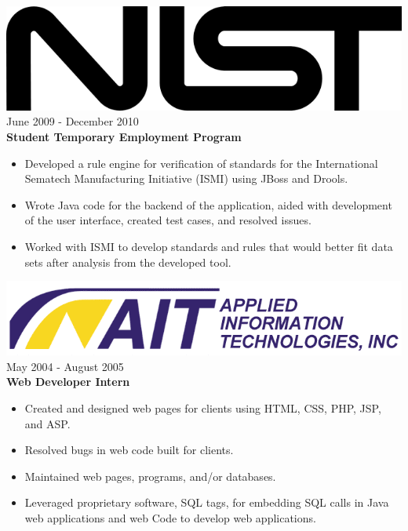 \documentclass[12pt, line, margin]{res}
\begin{document}
\begin{resume}
\pagebreak

	     {\sl \includegraphics[scale=0.07]{resume_images/645px-NIST_logo.png}} \hfill            June 2009 - December 2010 \\
                \textbf{Student Temporary Employment Program}
                \begin{itemize}  \itemsep -2pt %
                 \item Developed a rule engine for verification of standards for the \newline
                               International Sematech Manufacturing Initiative (ISMI) using JBoss
                               and Drools.
                 \item Wrote Java code for the backend of the application, aided
                               with development of the user interface,
                               created test cases, and resolved issues.
                 \item Worked with ISMI to develop standards and rules that would
                               better fit data sets after analysis from the developed tool.
                 \end{itemize} 

                {\sl \includegraphics[scale=0.2] {resume_images/ait_inc_logo.png}} \hfill        May 2004 - August 2005 \\
                \textbf{Web Developer Intern}
                  \begin{itemize}   \itemsep -2pt %
                 \item Created and designed web pages for clients using
                               HTML, CSS, PHP, JSP, and ASP.
                 \item Resolved bugs in web code built for clients.
                 \item Maintained web pages, programs, and/or databases.
                 \item Leveraged proprietary software, SQL tags, for embedding
                               SQL calls in Java web applications and web
                               Code to develop web applications.
                   \end{itemize} 


\end{resume}
\end{document}
